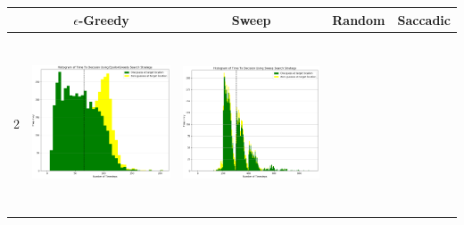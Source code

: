 \begin{landscape}
\begin{table}[h!]
  \centering
  \begin{tabular}{ | c | c | c | c | c |}
    \hline
    & $\epsilon$-Greedy & Sweep & Random & Saccadic \\
    \hline
    2 & 
    \begin{minipage}[c][58mm][c]{49mm}
      \includegraphics[width=49mm, height=52mm]{Chapters/MultiAgentTargetDetection/Figs/Histograms/MultipleAgent/2/SingleAgentSingleSource2EpsilonGreedyHistogram.png}
    \end{minipage}
    &
    \begin{minipage}[c][58mm][c]{49mm}
      \includegraphics[width=49mm, height=52mm]{Chapters/MultiAgentTargetDetection/Figs/Histograms/MultipleAgent/2/SingleAgentSingleSource2SweepHistogram.png}


\end{minipage}
\end{tabular}
\end{table}
\end{landscape}
